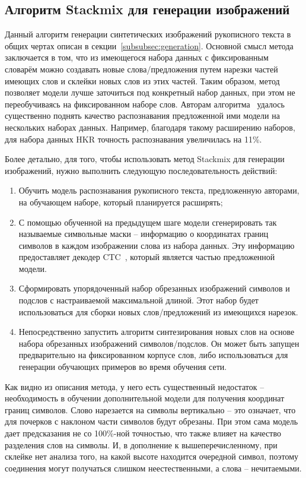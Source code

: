 \subsection{Алгоритм Stackmix для генерации изображений}
\label{subsec:stackmix}

Данный алгоритм генерации синтетических изображений рукописного текста в общих чертах описан в секции~\ref{subsubsec:generation}.
Основной смысл метода заключается в том, что из имеющегося набора данных с фиксированным словарём можно создавать новые слова/предложения
путем нарезки частей имеющих слов и склейки новых слов из этих частей.
Таким образом, метод позволяет модели лучше заточиться под конкретный набор данных, при этом не переобучиваясь на фиксированном наборе слов.
Авторам алгоритма~\cite{shonenkov2021stackmix} удалось существенно поднять качество распознавания предложенной ими модели
на нескольких наборах данных.
Например, благодаря такому расширению наборов, для набора данных HKR точность распознавания увеличилась на 11\%.

Более детально, для того, чтобы использовать метод Stackmix для генерации изображений, нужно выполнить следующую последовательность действий:
\begin{enumerate}
    \item Обучить модель распознавания рукописного текста, предложенную авторами, на обучающем наборе, который планируется расширять;
    \item С помощью обученной на предыдущем шаге модели сгенерировать так называемые символьные маски -- информацию о координатах границ символов в каждом изображении слова из набора данных.
    Эту информацию предоставляет декодер CTC~\cite{graves2008novel}, который является частью предложенной модели.
    \item Сформировать упорядоченный набор обрезанных изображений символов и подслов с настраиваемой максимальной длиной.
    Этот набор будет использоваться для сборки новых слов/предложений из имеющихся нарезок.
    \item Непосредственно запустить алгоритм синтезирования новых слов на основе набора обрезанных изображений символов/подслов.
    Он может быть запущен предварительно на фиксированном корпусе слов, либо использоваться для генерации обучающих примеров во время обучения сети.
\end{enumerate}

Как видно из описания метода, у него есть существенный недостаток -- необходимость в обучении дополнительной модели для получения координат границ символов.
Слово нарезается на символы вертикально -- это означает, что для почерков с наклоном части символов будут обрезаны.
При этом сама модель дает предсказания не со 100\%-ной точностью, что также влияет на качество разделения слов на символы.
И, в дополнение к вышеперечисленному, при склейке нет анализа того, на какой высоте находится очередной символ, поэтому соединения
могут получаться слишком неестественными, а слова -- нечитаемыми.


